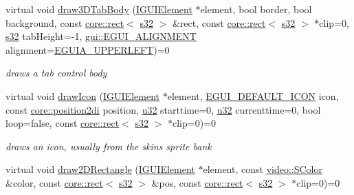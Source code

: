 \begin{DoxyCompactItemize}
virtual void \hyperlink{classirr_1_1gui_1_1IGUISkin_aeacbaa90b32b9665100320520d1d983f}{draw3\+D\+Tab\+Body} (\hyperlink{classirr_1_1gui_1_1IGUIElement}{I\+G\+U\+I\+Element} $\ast$element, bool border, bool background, const \hyperlink{classirr_1_1core_1_1rect}{core\+::rect}$<$ \hyperlink{namespaceirr_ac66849b7a6ed16e30ebede579f9b47c6}{s32} $>$ \&rect, const \hyperlink{classirr_1_1core_1_1rect}{core\+::rect}$<$ \hyperlink{namespaceirr_ac66849b7a6ed16e30ebede579f9b47c6}{s32} $>$ $\ast$clip=0, \hyperlink{namespaceirr_ac66849b7a6ed16e30ebede579f9b47c6}{s32} tab\+Height=-\/1, \hyperlink{namespaceirr_1_1gui_a19eb5fb40e67f108cb16aba922ddaa2d}{gui\+::\+E\+G\+U\+I\+\_\+\+A\+L\+I\+G\+N\+M\+E\+NT} alignment=\hyperlink{namespaceirr_1_1gui_a19eb5fb40e67f108cb16aba922ddaa2da4bb8a01452727274e18047a872da1809}{E\+G\+U\+I\+A\+\_\+\+U\+P\+P\+E\+R\+L\+E\+FT})=0
\begin{DoxyCompactList}\small\item\em draws a tab control body \end{DoxyCompactList}\item 
virtual void \hyperlink{classirr_1_1gui_1_1IGUISkin_a121399252e149f6977eb6cc706dd5867}{draw\+Icon} (\hyperlink{classirr_1_1gui_1_1IGUIElement}{I\+G\+U\+I\+Element} $\ast$element, \hyperlink{namespaceirr_1_1gui_a8e54aa253459daf0b62670bda4556d9f}{E\+G\+U\+I\+\_\+\+D\+E\+F\+A\+U\+L\+T\+\_\+\+I\+C\+ON} icon, const \hyperlink{namespaceirr_1_1core_a3643c2cc7820dd78cd87e73a46b92145}{core\+::position2di} position, \hyperlink{namespaceirr_a0416a53257075833e7002efd0a18e804}{u32} starttime=0, \hyperlink{namespaceirr_a0416a53257075833e7002efd0a18e804}{u32} currenttime=0, bool loop=false, const \hyperlink{classirr_1_1core_1_1rect}{core\+::rect}$<$ \hyperlink{namespaceirr_ac66849b7a6ed16e30ebede579f9b47c6}{s32} $>$ $\ast$clip=0)=0
\begin{DoxyCompactList}\small\item\em draws an icon, usually from the skin\textquotesingle{}s sprite bank \end{DoxyCompactList}\item 
virtual void \hyperlink{classirr_1_1gui_1_1IGUISkin_a137082ed352db8dcb713449dfba0ff3e}{draw2\+D\+Rectangle} (\hyperlink{classirr_1_1gui_1_1IGUIElement}{I\+G\+U\+I\+Element} $\ast$element, const \hyperlink{classirr_1_1video_1_1SColor}{video\+::\+S\+Color} \&color, const \hyperlink{classirr_1_1core_1_1rect}{core\+::rect}$<$ \hyperlink{namespaceirr_ac66849b7a6ed16e30ebede579f9b47c6}{s32} $>$ \&pos, const \hyperlink{classirr_1_1core_1_1rect}{core\+::rect}$<$ \hyperlink{namespaceirr_ac66849b7a6ed16e30ebede579f9b47c6}{s32} $>$ $\ast$clip=0)=0

\end{DoxyCompactItemize}
